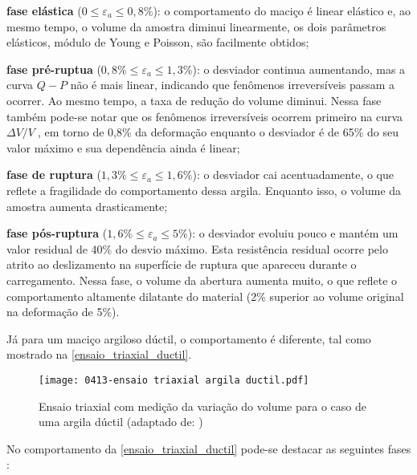 \begin{alineas}
	
	\item \textbf{fase elástica} ($0\le \varepsilon_a \le 0,8\%$): o comportamento do maciço é linear elástico e, ao mesmo tempo, o volume da amostra diminui linearmente, os dois parâmetros elásticos, módulo de Young e Poisson, são facilmente obtidos;
	
	\item \textbf{fase pré-ruptua} ($0,8\%\le \varepsilon_a \le 1,3\%$): o desviador continua aumentando, mas a curva $Q-P$ não é mais linear, indicando que fenômenos irreversíveis passam a ocorrer. Ao mesmo tempo, a taxa de redução do volume diminui. Nessa fase também pode-se notar que os fenômenos irreversíveis ocorrem primeiro na curva ${\Delta V}/{V}\;$, em torno de 0,8\% da deformação enquanto o desviador é de 65\% do seu valor máximo e sua dependência ainda é linear;
	
	\item \textbf{fase de ruptura} ($1,3\%\le \varepsilon_a \le 1,6\%$): o desviador cai acentuadamente, o que reflete a fragilidade do comportamento dessa argila. Enquanto isso, o volume da amostra aumenta drasticamente;
	
	\item \textbf{fase pós-ruptura} ($1,6\%\le \varepsilon_a \le 5\%$): o desviador evoluiu pouco e mantém um valor residual de 40\% do desvio máximo. Esta resistência residual ocorre pelo atrito ao deslizamento na superfície de ruptura que apareceu durante o carregamento. Nessa fase, o volume da abertura aumenta muito, o que reflete o comportamento altamente dilatante do material (2\% superior ao volume original na deformação de 5\%).
	
\end{alineas}

Já para um maciço argiloso dúctil, o comportamento é diferente, tal como mostrado na \autoref{ensaio_triaxial_ductil}.

\begin{figure}[H]
	\begin{center}
		\texttt{[image: 0413-ensaio triaxial argila ductil.pdf]}
	\end{center}
	\caption{\label{ensaio_triaxial_ductil}Ensaio triaxial com medição da variação do volume para o caso de uma argila dúctil (adaptado de: )}
\end{figure}

No comportamento da \autoref{ensaio_triaxial_ductil} pode-se destacar as seguintes fases \cite[p. 35]{Rousset1988}:

